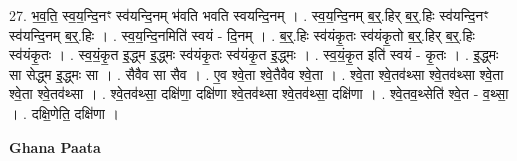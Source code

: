 \documentclass[17pt]{extarticle}
\begin{document}
27. भ॒व॒ति॒ स्व॒य॒न्दि॒नꣳ स्व॑यन्दि॒नम् भ॑वति भवति स्वयन्दि॒नम् । . स्व॒य॒न्दि॒नम् ब॒र्॒.हिर् ब॒र्॒.हिः स्व॑यन्दि॒नꣳ स्व॑यन्दि॒नम् ब॒र्॒.हिः । . स्व॒य॒न्दि॒नमिति॑ स्वयं - दि॒नम् । . ब॒र्॒.हिः स्व॑यंकृ॒तः स्व॑यंकृ॒तो ब॒र्॒.हिर् ब॒र्॒.हिः स्व॑यंकृ॒तः । . स्व॒यं॒कृ॒त इ॒द्ध्म इ॒द्ध्मः स्व॑यंकृ॒तः स्व॑यंकृ॒त इ॒द्ध्मः । . स्व॒यं॒कृ॒त इति॑ स्वयं - कृ॒तः । . इ॒द्ध्मः सा सेद्ध्म इ॒द्ध्मः सा । . सैवैव सा सैव । . ए॒व श्वे॒ता श्वे॒तैवैव श्वे॒ता । . श्वे॒ता श्वे॒तव॑थ्सा श्वे॒तव॑थ्सा श्वे॒ता श्वे॒ता श्वे॒तव॑थ्सा । . श्वे॒तव॑थ्सा॒ दक्षि॑णा॒ दक्षि॑णा श्वे॒तव॑थ्सा श्वे॒तव॑थ्सा॒ दक्षि॑णा । . श्वे॒तव॒थ्सेति॑ श्वे॒त - व॒थ्सा॒ । . दक्षि॒णेति॒ दक्षि॑णा । \newline

\textbf{Ghana Paata } \newline
\end{document}
